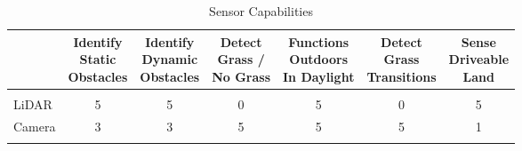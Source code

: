 \documentclass{article}
\begin{document}
		
		\begin{table}[H]
		\begin{adjustwidth}{-1.5in}{-1.5in}
		\setlength{\dashlinedash}{.4pt}
		\setlength\tabcolsep{4pt}
		\def\arraystretch{1.3}
		\centering


		\caption{Sensor Capabilities}
		\label{SensorCapabilitiesTable}
		\vspace{1em}
		\begin{tabular}{lcccccc}
		
                                                                     & \makecell{Identify \\ Static  \\ Obstacles} & \makecell{Identify \\ Dynamic \\ Obstacles} & \makecell{Detect \\ Grass / \\ No Grass} & \makecell{Functions \\ Outdoors \\ In Daylight} &\makecell{Detect \\ Grass \\ Transitions} & \makecell{Sense \\ Driveable \\ Land} \\ \hline
		\\[-2ex]
		LiDAR                                                        & 5                         & 5                          & 0                       & 5                              & 0                        & 5                    \\ \hdashline
		Camera                                                       & 3                         & 3                          & 5                       & 5                              & 5                        & 1                    \\ \hdashline
		

\end{tabular}
\end{adjustwidth}
\end{table}
\end{document}
